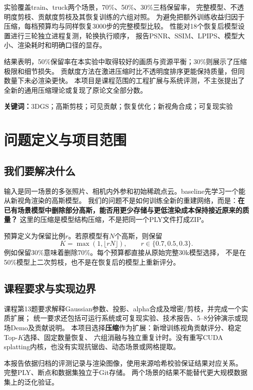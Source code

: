 \documentclass[UTF8,fontset=fandol,zihao=-4,a4paper]{ctexart}
\begin{document}
实验覆盖train、truck两个场景，70\%、50\%、30\%三档保留率，
完整模型、不透明度剪枝、贡献度剪枝及其恢复训练的六组对照。
为避免把额外训练收益归因于压缩，每档预算均与同样恢复3000步的完整模型比较。
性能对18个恢复后模型设置进行三轮独立进程复测，轮换执行顺序，
报告PSNR、SSIM、LPIPS、模型大小、渲染耗时和明确口径的显存。

结果表明，50\%保留率在本实验中取得较好的画质与资源平衡；30\%则展示了压缩极限和细节损失。
贡献度方法在激进压缩时比不透明度排序更能保持质量，但同数量下未必渲染更快。
本项目是课程范围的工程扩展与系统评测，不主张提出了全新的通用压缩理论或复现了原论文全部分数。

\textbf{关键词：}3DGS；高斯剪枝；可见贡献；恢复优化；新视角合成；可复现实验

\tableofcontents
\clearpage

\section{问题定义与项目范围}
\subsection{我们要解决什么}
输入是同一场景的多张照片、相机内外参和初始稀疏点云。baseline先学习一个能从新视角渲染的高斯模型。
我们的问题不是如何训练全新的重建网络，而是：\textbf{在已有场景模型中删除部分高斯，能否用更少存储与更低渲染成本保持接近原来的质量？}
这里的压缩是模型结构压缩，不是把同一个PLY文件打成ZIP。

预算定义为保留比例$r$。若原模型有$N$个高斯，则保留
\begin{equation}K=\max(1,\lfloor rN\rfloor),\qquad r\in\{0.7,0.5,0.3\}.\end{equation}
例如保留30\%意味着删除70\%。每个预算都直接从原始完整30k模型选择，
不是在50\%模型上二次剪枝，也不是在恢复后的模型上重新评分。

\subsection{课程要求与实现边界}
课程第13题要求解释Gaussian参数、投影、alpha合成及增密/剪枝，并完成一个实质扩展；
统一要求还包括可运行系统或可复现实验、技术报告、5--8分钟演示或现场Demo及贡献说明。
本项目选择\textbf{压缩}作为扩展：新增训练视角贡献评分、稳定Top-$K$选择、固定数量恢复、
六组消融与独立重复计时。没有重写CUDA splatting内核，也没有实现抗锯齿、动态场景或网格提取。

本报告依据归档的评测记录与渲染图像，使用来源哈希校验保证结果对应关系。
完整PLY、断点和数据集独立于Git存储。
两个场景的结果不能替代更大规模数据集上的泛化验证。
\end{document}
